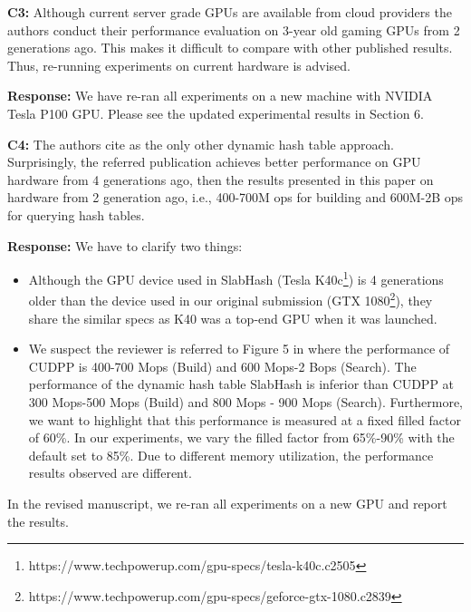 \begin{shaded}
	\noindent\textbf{C3:} Although current server grade GPUs are available from cloud providers the authors conduct their performance evaluation on 3-year old gaming GPUs from 2 generations ago. This makes it difficult to compare with other published results. Thus, re-running experiments on current hardware is advised.
\end{shaded}
%
\noindent\textbf{Response:} 
We have re-ran all experiments on a new machine with NVIDIA Tesla P100 GPU. Please see the updated experimental results in Section 6.

\begin{shaded}
	\noindent\textbf{C4:} The authors cite \cite{ashkiani2018dynamic} as the only other dynamic hash table approach. Surprisingly, the referred publication achieves better performance on GPU hardware from 4 generations ago, then the results presented in this paper on hardware from 2 generation ago, i.e., 400-700M ops for building and 600M-2B ops for querying hash tables.
\end{shaded}
%
\noindent\textbf{Response:} 
We have to clarify two things: 
\begin{itemize}[noitemsep]
	\item Although the GPU device used in SlabHash \cite{ashkiani2018dynamic} (Tesla K40c\footnote{https://www.techpowerup.com/gpu-specs/tesla-k40c.c2505}) is 4 generations older than the device used in our original submission (GTX 1080\footnote{https://www.techpowerup.com/gpu-specs/geforce-gtx-1080.c2839}), they share the similar specs as K40 was a top-end GPU when it was launched. 
	\item We suspect the reviewer is referred to Figure 5 in \cite{ashkiani2018dynamic} where the performance of CUDPP is 400-700 Mops (Build) and 600 Mops-2 Bops (Search). The performance of the dynamic hash table SlabHash is inferior than CUDPP at 300 Mops-500 Mops (Build) and 800 Mops - 900 Mops (Search). Furthermore, we want to highlight that this performance is measured at a fixed filled factor of 60\%. In our experiments, we vary the filled factor from 65\%-90\% with the default set to 85\%. Due to different memory utilization, the performance results observed are different.
\end{itemize}
%
In the revised manuscript, we re-ran all experiments on a new GPU and report the results.


